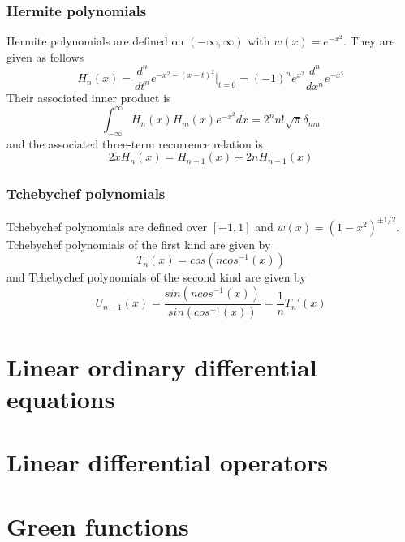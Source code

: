 \documentclass[]{article}
\begin{document}
\subsubsection{Hermite polynomials}
Hermite polynomials are defined on $(-\infty, \infty)$ with $w(x) = e^{-x^{2}}$. They are given as follows
\begin{equation} H_{n}(x) = \frac{d^{n}}{dt^{n}}e^{-x^{2}-(x-t)^{2}}\bigg|_{t=0} = (-1)^{n}e^{x^{2}}\frac{d^{n}}{dx^{n}}e^{-x^{2}} \end{equation}
Their associated inner product is
\begin{equation} \int_{-\infty}^{\infty} H_{n}(x) H_{m}(x) e^{-x^{2}}dx = 2^{n}n!\sqrt{\pi} \delta_{nm} \end{equation}
and the associated three-term recurrence relation is
\begin{equation} 2xH_{n}(x) = H_{n+1}(x) + 2nH_{n-1}(x) \end{equation}

\subsubsection{Tchebychef polynomials}
Tchebychef polynomials are defined over $[-1, 1]$ and $w(x) = (1-x^{2})^{\pm 1/2}$. Tchebychef polynomials of the first kind are given by
\begin{equation} T_{n}(x) = cos(ncos^{-1}(x))  \end{equation}
and Tchebychef polynomials of the second kind are given by
\begin{equation} U_{n-1}(x) = \frac{sin(ncos^{-1}(x))}{sin(cos^{-1}(x))} = \frac{1}{n}T_{n}'(x) \end{equation}
\newpage
\section{Linear ordinary differential equations}


\newpage
\section{Linear differential operators}


\newpage
\section{Green functions}
\end{document}
